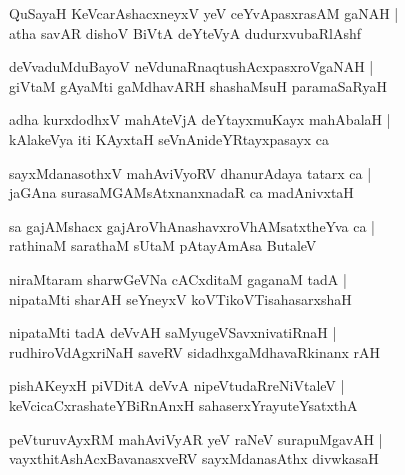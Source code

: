 \documentclass[twoside,12pt,openright]{book}
\newcounter{shloka}[chapter]
\begin{document}
\begin{shloka}%
QuSayaH KeVcarAshacxneyxV yeV ceYvApasxrasAM gaNAH |\\
atha savAR dishoV BiVtA deYteVyA dudurxvubaRlAshf
\end{shloka}

\begin{shloka}%
deVvaduMduBayoV neVdunaRnaqtushAcxpasxroVgaNAH |\\
giVtaM gAyaMti gaMdhavARH shashaMsuH paramaSaRyaH 
\end{shloka}

\begin{shloka}%
adha kurxdodhxV mahAteVjA deYtayxmuKayx mahAbalaH |\\
kAlakeVya iti KAyxtaH seVnAnideYRtayxpasayx ca 
\end{shloka}

\begin{shloka}%
sayxMdanasothxV mahAviVyoRV dhanurAdaya tatarx ca |\\
jaGAna surasaMGAMsAtxnanxnadaR ca madAnivxtaH 
\end{shloka}

\begin{shloka}%
sa gajAMshacx gajAroVhAnashavxroVhAMsatxtheYva ca |\\
rathinaM sarathaM sUtaM pAtayAmAsa ButaleV 
\end{shloka}

\begin{shloka}%
niraMtaram sharwGeVNa cACxditaM gaganaM tadA |\\
nipataMti sharAH seYneyxV koVTikoVTisahasarxshaH 
\end{shloka}

\begin{shloka}%
nipataMti tadA deVvAH saMyugeVSavxnivatiRnaH |\\
rudhiroVdAgxriNaH saveRV sidadhxgaMdhavaRkinanx rAH 
\end{shloka}

\begin{shloka}%
pishAKeyxH piVDitA deVvA nipeVtudaRreNiVtaleV |\\
keVcicaCxrashateYBiRnAnxH sahaserxYrayuteYsatxthA 
\end{shloka}

\begin{shloka}%
peVturuvAyxRM mahAviVyAR yeV raNeV surapuMgavAH |\\
vayxthitAshAcxBavanasxveRV sayxMdanasAthx divwkasaH 
\end{shloka}
\end{document}
